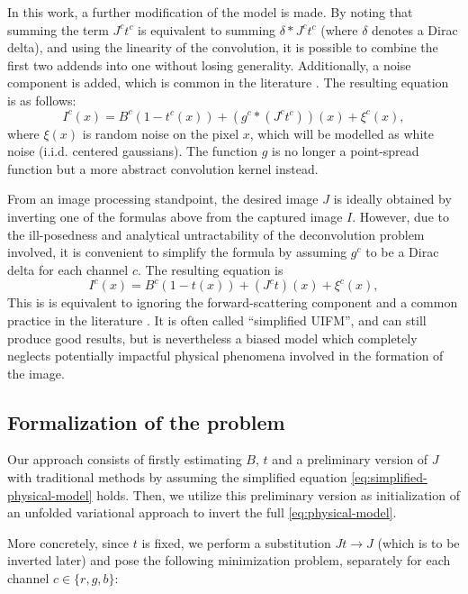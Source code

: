 \documentclass[twocolumn,twoside,a4paper,10pt]{IEEEtran}
\begin{document}
In this work, a further modification of the model is made. By noting that summing the term \(J^ct^c\) is equivalent to summing \(\delta\ast J^ct^c\) (where \(\delta\) denotes a Dirac delta), and using the linearity of the convolution, it is possible to combine the first two addends into one without 
losing generality. Additionally, a noise component is added, which is common in the literature \cite{xie2021variational}. The resulting equation is as follows:
\begin{equation}\label{eq:physical-model}
  I^c(x) = B^c\left(1 - t^c(x)\right) + \left(g^c\ast\left(J^c t^c\right)\right) (x) + \xi^c(x),
\end{equation}
where \(\xi(x)\) is random noise on the pixel \(x\), which will be modelled as white noise (i.i.d. centered gaussians). The function \(g\) is no longer a point-spread function but a more abstract convolution kernel instead.

From an image processing standpoint, the desired image \(J\) is ideally obtained by inverting one of the formulas above from the captured image \(I\). However, due to the ill-posedness and analytical untractability of the deconvolution problem involved, it is convenient to simplify the formula by assuming \(g^c\) to be a Dirac delta for each channel \(c\). The resulting equation is
\begin{equation}\label{eq:simplified-physical-model}
  I^c(x) = B^c\left(1 - t(x)\right) + \left(J^c t\right) (x) + \xi^c(x),
\end{equation}
This is is equivalent to ignoring the forward-scattering component and a common practice in the literature \cite{ancuti2017color}. It is often called ``simplified UIFM'', and can still produce good results, but is nevertheless a biased model which completely neglects potentially impactful physical phenomena involved in the formation of the image.

\subsection{Formalization of the problem}
Our approach consists of firstly estimating \(B\), \(t\) and a preliminary version of \(J\) with traditional methods by assuming the simplified equation \cref{eq:simplified-physical-model} holds. Then, we utilize this preliminary version as initialization of an unfolded variational approach to invert the full \cref{eq:physical-model}.

More concretely, since \(t\) is fixed, we perform a substitution \(Jt\to J\) (which is to be inverted later) and pose the following minimization problem, separately for each channel \(c\in\{r, g, b\}\):
\end{document}
